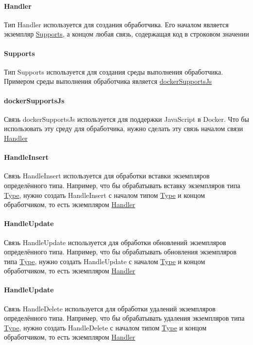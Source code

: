 \paragraph*{Handler}\hypertarget{Core.Handler.Description}{}
Тип Handler используется для создания обработчика.
Его началом является экземпляр \hyperlink{supports.Description}{Supports}, а
концом
любая связь, содержащая код в строковом значении
\paragraph*{Supports}\hypertarget{Core.Supports.Description}{}
Тип Supports используется для создания среды
выполнения обработчика. Примером среды выполнения обработчика является
\hyperlink{Core.dockerSupportsJs.Description}{dockerSupportsJs}
\paragraph*{dockerSupportsJs}\hypertarget{Core.dockerSupportsJs.Description}{}
Связь dockerSupportsJs используется для
поддержки JavaScript в Docker. Что бы использовать эту среду для обработчика,
нужно сделать эту связь началом связи
\hyperlink{Core.Handler.Description}{Handler}
\paragraph*{HandleInsert}\hypertarget{Core.HandleInsert.Description}{}
Связь HandleInsert используется для обработки
вставки экземпляров определённого типа. Например, что бы обрабатывать вставку
экземпляров типа \hyperlink{Core.Type.Description}{Type}, нужно создать
HandleInsert с
началом типом \hyperlink{Core.Type.Description}{Type} и концом обработчиком, то
есть
экземпляром \hyperlink{Core.Handler.Description}{Handler}
\paragraph*{HandleUpdate}\hypertarget{Core.HandleUpdate.Description}{}
Связь HandleUpdate используется для обработки
обновлений экземпляров определённого типа. Например, что бы обрабатывать
обновления экземпляров типа \hyperlink{Core.Type.Description}{Type}, нужно
создать
HandleUpdate с началом \hyperlink{Core.Type.Description}{Type} и концом
обработчиком,
то есть экземпляром \hyperlink{Core.Handler.Description}{Handler}
\paragraph*{HandleUpdate}\hypertarget{Core.HandleDelete.Description}{}
Связь HandleDelete используется для обработки
удалений экземпляров определённого типа. Например, что бы обрабатывать удаления
экземпляров типа \hyperlink{Core.Type.Description}{Type}, нужно создать
HandleDelete с
началом типом \hyperlink{Core.Type.Description}{Type} и концом обработчиком, то
есть
экземпляром \hyperlink{Core.Handler.Description}{Handler}
